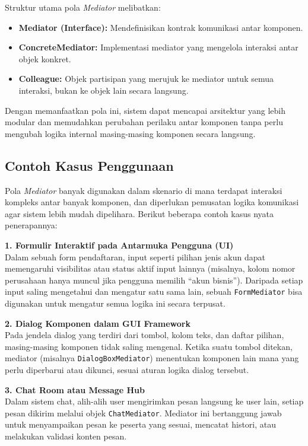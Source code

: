 Struktur utama pola \textit{Mediator} melibatkan:
\begin{itemize}
	\item \textbf{Mediator (Interface):} Mendefinisikan kontrak komunikasi antar komponen.
	\item \textbf{ConcreteMediator:} Implementasi mediator yang mengelola interaksi antar objek konkret.
	\item \textbf{Colleague:} Objek partisipan yang merujuk ke mediator untuk semua interaksi, bukan ke objek lain secara langsung.
\end{itemize}

Dengan memanfaatkan pola ini, sistem dapat mencapai arsitektur yang lebih modular dan memudahkan perubahan perilaku antar komponen tanpa perlu mengubah logika internal masing-masing komponen secara langsung.

\subsection{Contoh Kasus Penggunaan}

Pola \textit{Mediator} banyak digunakan dalam skenario di mana terdapat interaksi kompleks antar banyak komponen, dan diperlukan pemusatan logika komunikasi agar sistem lebih mudah dipelihara. Berikut beberapa contoh kasus nyata penerapannya:

\textbf{1. Formulir Interaktif pada Antarmuka Pengguna (UI)} \\
Dalam sebuah form pendaftaran, input seperti pilihan jenis akun dapat memengaruhi visibilitas atau status aktif input lainnya (misalnya, kolom nomor perusahaan hanya muncul jika pengguna memilih “akun bisnis”). Daripada setiap input saling mengetahui dan mengatur satu sama lain, sebuah \texttt{FormMediator} bisa digunakan untuk mengatur semua logika ini secara terpusat.

\textbf{2. Dialog Komponen dalam GUI Framework} \\
Pada jendela dialog yang terdiri dari tombol, kolom teks, dan daftar pilihan, masing-masing komponen tidak saling mengenal. Ketika suatu tombol ditekan, mediator (misalnya \texttt{DialogBoxMediator}) menentukan komponen lain mana yang perlu diperbarui atau dikunci, sesuai aturan logika dialog tersebut.

\textbf{3. Chat Room atau Message Hub} \\
Dalam sistem chat, alih-alih user mengirimkan pesan langsung ke user lain, setiap pesan dikirim melalui objek \texttt{ChatMediator}. Mediator ini bertanggung jawab untuk menyampaikan pesan ke peserta yang sesuai, mencatat histori, atau melakukan validasi konten pesan.

